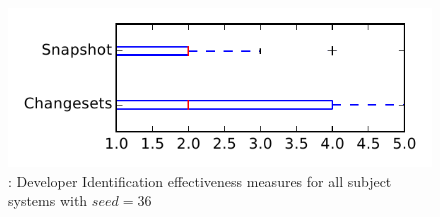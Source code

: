 
\begin{figure}
\centering
\includegraphics[height=0.4\textheight]{figures/dit_seed/rq1_tiny_36}
\caption{\rtwo: Developer Identification effectiveness measures for all subject systems with $seed=36$}
\label{fig:dit_seed:rq1:tiny}
\end{figure}

